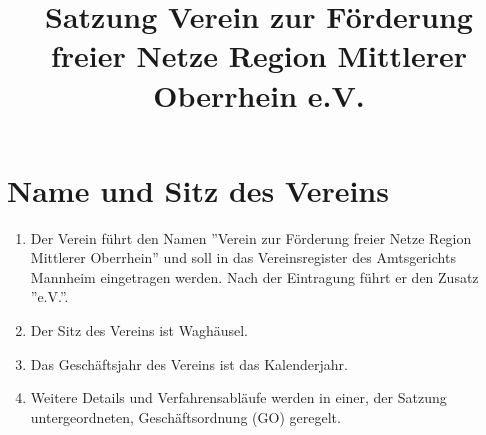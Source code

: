 \documentclass[12pt,a4paper,titlepage]{scrartcl}
\title{Satzung Verein zur Förderung freier Netze Region Mittlerer Oberrhein e.V.}
\begin{document}
\maketitle
{}
\thispagestyle{empty}
\newpage
{}
\setcounter{page}{1}

\section{Name und Sitz des Vereins}
\begin{enumerate}
\item Der Verein führt den Namen ''Verein zur Förderung freier Netze Region Mittlerer Oberrhein'' und soll in das Vereinsregister des Amtsgerichts Mannheim eingetragen werden. Nach der Eintragung führt er den Zusatz ''e.V.''.
\item Der Sitz des Vereins ist Waghäusel.
\item Das Geschäftsjahr des Vereins ist das Kalenderjahr. 
\item Weitere Details und Verfahrensabläufe werden in einer, der Satzung untergeordneten, Geschäftsordnung (GO) geregelt. 
\end{enumerate}
\end{document}
